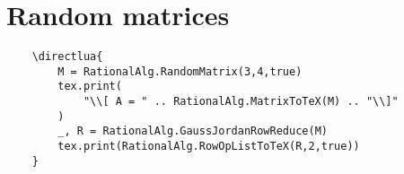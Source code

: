 \documentclass[11pt]{article}
\begin{document}
\pagebreak
\section*{Random matrices}

\begin{lstlisting}
    \directlua{
        M = RationalAlg.RandomMatrix(3,4,true) 
        tex.print(
            "\\[ A = " .. RationalAlg.MatrixToTeX(M) .. "\\]"
        )
        _, R = RationalAlg.GaussJordanRowReduce(M)
        tex.print(RationalAlg.RowOpListToTeX(R,2,true))
    }
\end{lstlisting}

 
\end{document}
